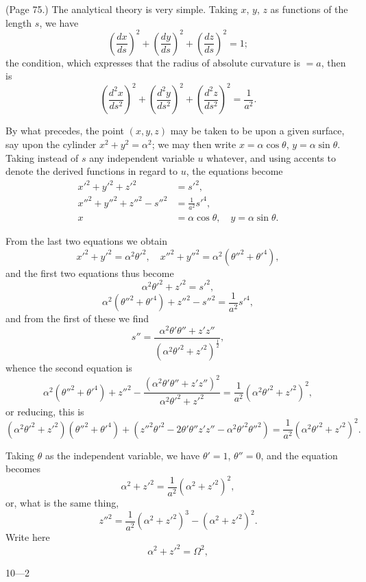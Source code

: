 \documentclass[11pt,a4paper]{article}
\begin{document}
\bigskip

\noindent (Page 75.) The analytical theory is very simple. Taking $x$, $y$, $z$ as functions of the length $s$, we have
\[
\left(\frac{dx}{ds}\right)^2 + \left(\frac{dy}{ds}\right)^2 + \left(\frac{dz}{ds}\right)^2 = 1;
\]
the condition, which expresses that the radius of absolute curvature is $= a$, then is
\[
\left(\frac{d^2 x}{ds^2}\right)^2 + \left(\frac{d^2 y}{ds^2}\right)^2 + \left(\frac{d^2 z}{ds^2}\right)^2 = \frac{1}{a^2}.
\]

By what precedes, the point $(x, y, z)$ may be taken to be upon a given surface, say upon the cylinder $x^2 + y^2 = \alpha^2$; we may then write $x = \alpha\cos\theta$, $y = \alpha\sin\theta$. Taking instead of $s$ any independent variable $u$ whatever, and using accents to denote the derived functions in regard to $u$, the equations become
\begin{align*}
x'^2 + y'^2 + z'^2 &= s'^2, \\
x''^2 + y''^2 + z''^2 - s''^2 &= \frac{1}{a^2} s'^4, \\
x &= \alpha\cos\theta,\quad y = \alpha\sin\theta.
\end{align*}

From the last two equations we obtain
\[
x'^2 + y'^2 = \alpha^2 \theta'^2,\quad x''^2 + y''^2 = \alpha^2 (\theta''^2 + \theta'^4),
\]
and the first two equations thus become
\[
\alpha^2 \theta'^2 + z'^2 = s'^2,
\]
\[
\alpha^2 (\theta''^2 + \theta'^4) + z''^2 - s''^2 = \frac{1}{a^2} s'^4,
\]
and from the first of these we find
\[
s'' = \frac{\alpha^2 \theta' \theta'' + z' z''}{(\alpha^2 \theta'^2 + z'^2)^{\tfrac{1}{2}}},
\]
whence the second equation is
\[
\alpha^2 (\theta''^2 + \theta'^4) + z''^2 - \frac{(\alpha^2 \theta' \theta'' + z' z'')^2}{\alpha^2 \theta'^2 + z'^2} = \frac{1}{a^2} (\alpha^2 \theta'^2 + z'^2)^2,
\]
or reducing, this is
\[
(\alpha^2 \theta'^2 + z'^2)(\theta''^2 + \theta'^4) + (z''^2 \theta'^2 - 2\theta'\theta'' z' z'' - \alpha^2 \theta'^2 \theta''^2) = \frac{1}{a^2} (\alpha^2 \theta'^2 + z'^2)^2.
\]

Taking $\theta$ as the independent variable, we have $\theta' = 1$, $\theta'' = 0$, and the equation becomes
\[
\alpha^2 + z'^2 = \frac{1}{a^2} (\alpha^2 + z'^2)^2,
\]
or, what is the same thing,
\[
z''^2 = \frac{1}{a^2} (\alpha^2 + z'^2)^3 - (\alpha^2 + z'^2)^2.
\]
Write here
\[
\alpha^2 + z'^2 = \Omega^2,
\]

\hfill 10---2
\end{document}
